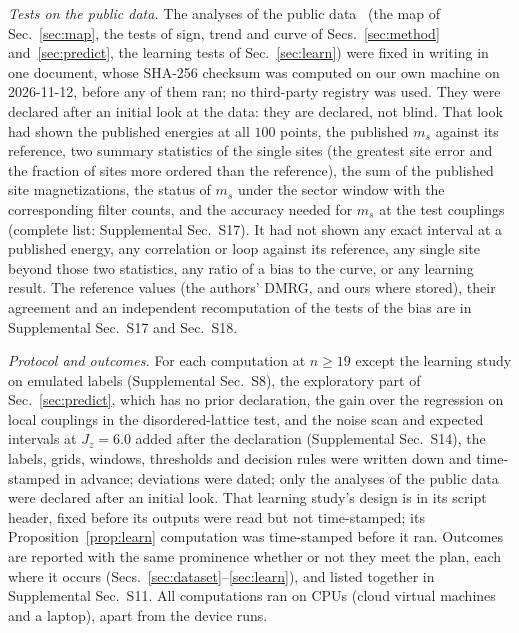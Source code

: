 \documentclass[aps,prx,twocolumn,10pt,superscriptaddress,nofootinbib,longbibliography,floatfix]{revtex4-2}
\theoremstyle{remark}
\newcommand{\Jz}{J_z}
\newcommand{\ms}{m_s}
\begin{document}
\emph{Tests on the public data.} The analyses of the public data~\cite{jaderberg2026data} (the map of
Sec.~\ref{sec:map}, the tests of sign, trend and curve of Secs.~\ref{sec:method} and~\ref{sec:predict}, the learning
tests of Sec.~\ref{sec:learn}) were fixed in writing in one document, whose SHA-256 checksum was computed on our own %
machine on 2026-11-12, before any of them ran; no third-party registry was used. They were declared after an initial %
look at the data: they are declared, not blind. That look had shown the published energies at all $100$ points, the %
published $\ms$ against its reference, two summary statistics of the single sites (the greatest site error and the
fraction of sites more ordered than the reference), the sum of the published site magnetizations, the status of
$\ms$ under the sector window with the corresponding filter counts, and the accuracy needed for $\ms$ at the test
couplings (complete list: Supplemental Sec.~S17). It had not shown any exact interval at a published energy, any correlation or loop against its reference,
any single site beyond those two statistics, any
ratio of a bias to the curve, or any learning result. The reference values (the authors'
DMRG, and ours where stored), their agreement and an independent recomputation of the tests of the bias are in
Supplemental Sec.~S17 and Sec.~S18.

\emph{Protocol and outcomes.} For each computation at $n\ge19$ except the learning study on emulated labels %
(Supplemental Sec.~S8), the exploratory part of Sec.~\ref{sec:predict}, which has no prior declaration, the gain
over the regression on local couplings in the disordered-lattice test, and the noise scan and expected intervals at
$\Jz=6.0$ added after the declaration (Supplemental Sec.~S14), %
the labels, grids, windows, thresholds and decision rules were written down and time-stamped in advance; deviations
were dated; only the analyses of the public data were declared after an initial look. That learning
study's design is in its script header, fixed before its outputs were read but not time-stamped; its
Proposition~\ref{prop:learn} computation was time-stamped before it ran. Outcomes are reported with the same
prominence whether or not they meet the plan, each where it occurs (Secs.~\ref{sec:dataset}--\ref{sec:learn}), and listed together in Supplemental Sec.~S11. All
computations ran on CPUs (cloud virtual machines and a laptop), apart from the device runs.
\end{document}
